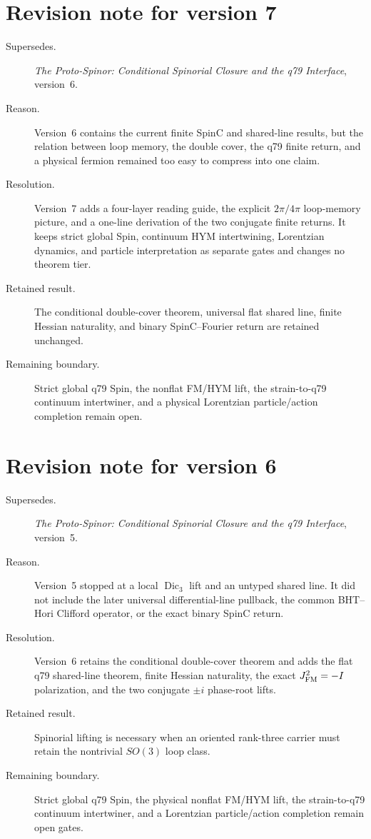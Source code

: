 \documentclass[11pt]{article}
\begin{document}
\section*{Revision note for version 7}
\begin{description}
\item[Supersedes.] \emph{The Proto-Spinor: Conditional Spinorial Closure and
the q79 Interface}, version~6.
\item[Reason.] Version~6 contains the current finite SpinC and shared-line
results, but the relation between loop memory, the double cover, the q79
finite return, and a physical fermion remained too easy to compress into one
claim.
\item[Resolution.] Version~7 adds a four-layer reading guide, the explicit
$2\pi/4\pi$ loop-memory picture, and a one-line derivation of the two
conjugate finite returns. It keeps strict global Spin, continuum HYM
intertwining, Lorentzian dynamics, and particle interpretation as separate
gates and changes no theorem tier.
\item[Retained result.] The conditional double-cover theorem, universal flat
shared line, finite Hessian naturality, and binary SpinC--Fourier return are
retained unchanged.
\item[Remaining boundary.] Strict global q79 Spin, the nonflat FM/HYM lift,
the strain-to-q79 continuum intertwiner, and a physical Lorentzian
particle/action completion remain open.
\end{description}

\section*{Revision note for version 6}
\begin{description}
\item[Supersedes.] \emph{The Proto-Spinor: Conditional Spinorial Closure and
the q79 Interface}, version~5.
\item[Reason.] Version~5 stopped at a local $\operatorname{Dic}_3$ lift and an
untyped shared line. It did not include the later universal differential-line
pullback, the common BHT--Hori Clifford operator, or the exact binary SpinC
return.
\item[Resolution.] Version~6 retains the conditional double-cover theorem and
adds the flat q79 shared-line theorem, finite Hessian naturality, the exact
$J_{\rm FM}^2=-I$ polarization, and the two conjugate $\pm i$ phase-root lifts.
\item[Retained result.] Spinorial lifting is necessary when an oriented
rank-three carrier must retain the nontrivial $SO(3)$ loop class.
\item[Remaining boundary.] Strict global q79 Spin, the physical nonflat
FM/HYM lift, the strain-to-q79 continuum intertwiner, and a Lorentzian
particle/action completion remain open gates.
\end{description}
\end{document}

